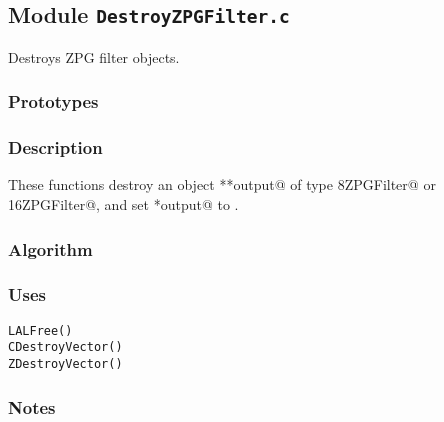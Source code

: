 
\subsection{Module \texttt{DestroyZPGFilter.c}}

Destroys ZPG filter objects.

\subsubsection{Prototypes}
\vspace{0.1in}


\subsubsection{Description}

These functions destroy an object \verb@**output@ of type
\verb@COMPLEX8ZPGFilter@ or \verb@COMPLEX16ZPGFilter@, and set
\verb@*output@ to \verb@NULL@.

\subsubsection{Algorithm}

\subsubsection{Uses}
\begin{verbatim}
LALFree()
CDestroyVector()
ZDestroyVector()
\end{verbatim}

\subsubsection{Notes}


